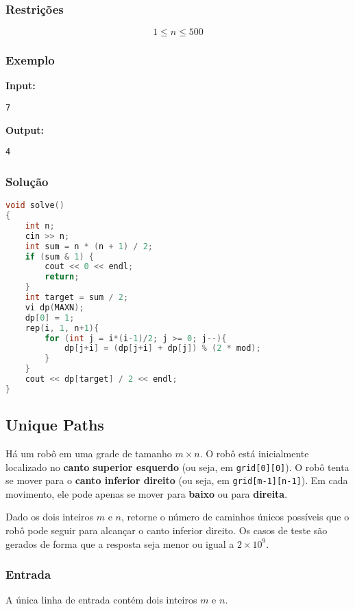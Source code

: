 \subsubsection*{Restrições}
\[
1 \le n \le 500
\]

\subsubsection*{Exemplo}

\textbf{Input:}
\begin{verbatim}
7
\end{verbatim}

\textbf{Output:}
\begin{verbatim}
4
\end{verbatim}

\subsubsection*{Solução}
\begin{lstlisting}[language=C++]
void solve()
{
    int n; 
    cin >> n;
    int sum = n * (n + 1) / 2;
    if (sum & 1) {
        cout << 0 << endl;
        return;
    }
    int target = sum / 2;
    vi dp(MAXN);
    dp[0] = 1;
    rep(i, 1, n+1){
        for (int j = i*(i-1)/2; j >= 0; j--){
            dp[j+i] = (dp[j+i] + dp[j]) % (2 * mod);
        }
    }
    cout << dp[target] / 2 << endl;
}
\end{lstlisting}
\subsection{Unique Paths}
Há um robô em uma grade de tamanho \( m \times n \). O robô está inicialmente localizado no \textbf{canto superior esquerdo} (ou seja, em \texttt{grid[0][0]}). O robô tenta se mover para o \textbf{canto inferior direito} (ou seja, em \texttt{grid[m-1][n-1]}). Em cada movimento, ele pode apenas se mover para \textbf{baixo} ou para \textbf{direita}.

Dado os dois inteiros \( m \) e \( n \), retorne o número de caminhos únicos possíveis que o robô pode seguir para alcançar o canto inferior direito. Os casos de teste são gerados de forma que a resposta seja menor ou igual a \(2 \times 10^9\).

\subsubsection*{Entrada}
A única linha de entrada contém dois inteiros \( m \) e \( n \).

